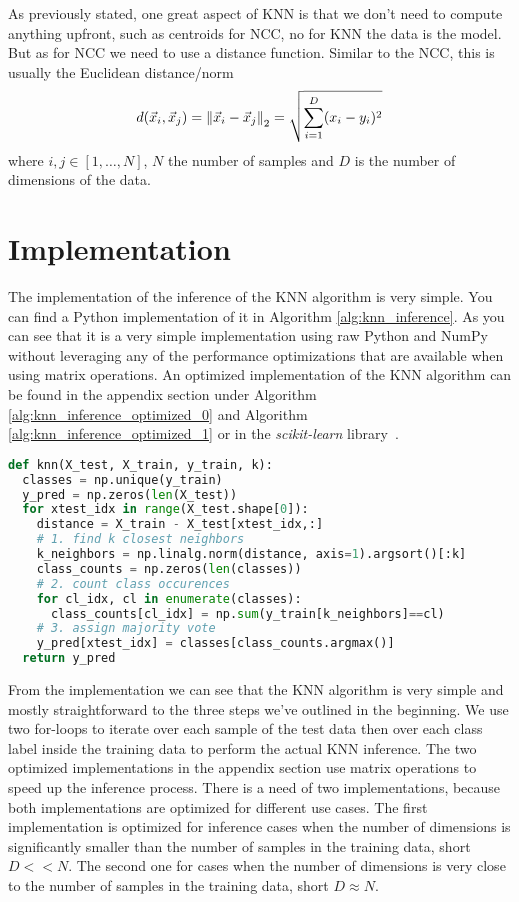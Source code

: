 As previously stated, one great aspect of KNN is that we don't need to compute anything upfront, such as centroids for NCC, no for KNN the data is the model.
But as for NCC we need to use a distance function.
Similar to the NCC, this is usually the Euclidean distance/norm
\begin{equation*}
  d(\vec{x}_i, \vec{x}_j) = \left\lVert\vec{x}_i - \vec{x}_j\right\rVert_2 = \sqrt{\sum_{i=1}^D (x_i - y_i)^2}
\end{equation*}
where $i, j \in [1,\dots,N]$, $N$ the number of samples and $D$ is the number of dimensions of the data.

\section{Implementation}

The implementation of the inference of the KNN algorithm is very simple. You can find a Python implementation of it in Algorithm \ref{alg:knn_inference}.
As you can see that it is a very simple implementation using raw Python and NumPy without leveraging any of the performance optimizations that are available when using matrix operations.
An optimized implementation of the KNN algorithm can be found in the appendix section under Algorithm \ref{alg:knn_inference_optimized_0} and Algorithm \ref{alg:knn_inference_optimized_1} or in the \textit{scikit-learn} library~\cite{scikit-learn}.

\begin{lstlisting}[language=Python, caption=KNN inference, label={alg:knn_inference}]
def knn(X_test, X_train, y_train, k):
  classes = np.unique(y_train)
  y_pred = np.zeros(len(X_test))
  for xtest_idx in range(X_test.shape[0]):
    distance = X_train - X_test[xtest_idx,:]
    # 1. find k closest neighbors
    k_neighbors = np.linalg.norm(distance, axis=1).argsort()[:k]
    class_counts = np.zeros(len(classes))
    # 2. count class occurences
    for cl_idx, cl in enumerate(classes):
      class_counts[cl_idx] = np.sum(y_train[k_neighbors]==cl)
    # 3. assign majority vote
    y_pred[xtest_idx] = classes[class_counts.argmax()]
  return y_pred
\end{lstlisting}
From the implementation we can see that the KNN algorithm is very simple and mostly straightforward to the three steps we've outlined in the beginning.
We use two for-loops to iterate over each sample of the test data then over each class label inside the training data to perform the actual KNN inference.\newline
The two optimized implementations in the appendix section use matrix operations to speed up the inference process.
There is a need of two implementations, because both implementations are optimized for different use cases.
The first implementation is optimized for inference cases when the number of dimensions is significantly smaller than the number of samples in the training data, short $D << N$.
The second one for cases when the number of dimensions is very close to the number of samples in the training data, short $D \approx N$.

